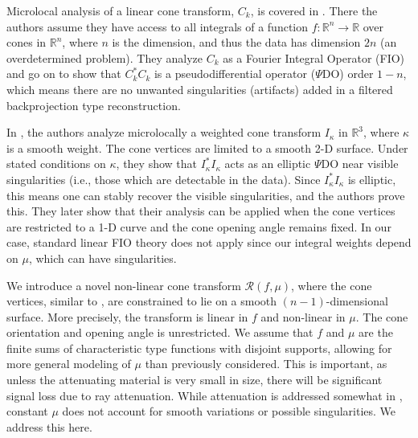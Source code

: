 \documentclass[a4paper,12pt]{amsart}
\numberwithin{equation}{section}
\theoremstyle{plain}
\numberwithin{theorem}{section}
\theoremstyle{definition}
\theoremstyle{remark}
\theoremstyle{remark}
\theoremstyle{remark}
\begin{document}
Microlocal analysis of a linear cone transform, $C_k$, is covered in \cite{terzioglu2019some}. There the authors assume they have access to all integrals of a function $f : \mathbb{R}^n \to \mathbb{R}$ over cones in $\mathbb{R}^n$, where $n$ is the dimension, and thus the data has dimension $2n$ (an overdetermined problem). They analyze $C_k$ as a Fourier Integral Operator (FIO) and go on to show that $C_k^*C_k$ is a pseudodifferential operator ($\Psi$DO) order $1-n$, which means there are no unwanted singularities (artifacts) added in a filtered backprojection type reconstruction.

In \cite{zhang2020recovery}, the authors analyze microlocally a weighted cone transform $I_\kappa$ in $\mathbb{R}^3$, where $\kappa$ is a smooth weight. The cone vertices are limited to a smooth 2-D surface. Under stated conditions on $\kappa$, they show that $I_\kappa^*I_\kappa$ acts as an elliptic $\Psi$DO near visible singularities (i.e., those which are detectable in the data). Since $I_\kappa^*I_\kappa$ is elliptic, this means one can stably recover the visible singularities, and the authors prove this. They later show that their analysis can be applied when the cone vertices are restricted to a 1-D curve and the cone opening angle remains fixed. In our case, standard linear FIO theory does not apply since our integral weights depend on $\mu$, which can have singularities.

We introduce a novel non-linear cone transform $\mathcal{R}(f,\mu)$, where the cone vertices, similar to \cite{zhang2020recovery}, are constrained to lie on a smooth $(n-1)$-dimensional surface. More precisely, the transform is linear in $f$ and non-linear in $\mu$. The cone orientation and opening angle is unrestricted. We assume that $f$ and $\mu$ are the finite sums of characteristic type functions with disjoint supports, allowing for more general modeling of $\mu$ than previously considered. This is important, as unless the attenuating material is very small in size, there will be significant signal loss due to ray attenuation. While attenuation is addressed somewhat in \cite{moon2025inversion}, constant $\mu$ does not account for smooth variations or possible singularities. We address this here.
\end{document}

